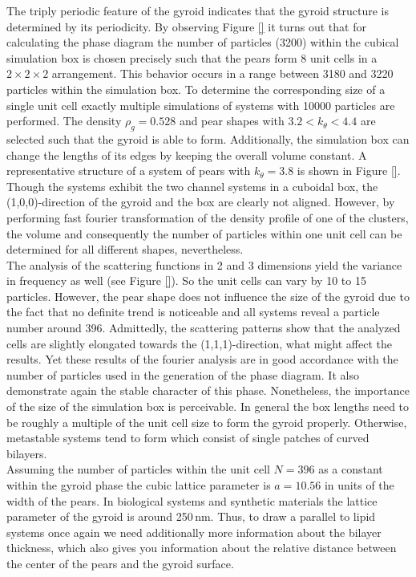 \documentclass[epj,onecolumn]{webofc}
\begin{document}
The triply periodic feature of the gyroid indicates that the gyroid structure is determined by its periodicity. By observing Figure \ref{} it turns out that for calculating the phase diagram the number of particles (3200) within the 
cubical simulation box is chosen precisely such that the pears form 8 unit cells in a $2\times 2\times 2$ arrangement. This behavior occurs in a range between 3180 and 3220 particles within the simulation box. To determine the 
corresponding size of a single unit cell exactly multiple simulations of systems with 10000 particles are performed. The density $\rho_g=0.528$ and pear shapes with $3.2<k_{\theta}<4.4$ are selected such that the gyroid is able 
to form. Additionally, the simulation box can change the lengths of its edges by keeping the overall volume constant. A representative structure of a system of pears with $k_{\theta}=3.8$ is shown in Figure \ref{}. Though the 
systems exhibit the two channel systems in a cuboidal box, the (1,0,0)-direction of the gyroid and the box are clearly not aligned. However, by performing fast fourier transformation of the density profile of one of the clusters, the 
volume and consequently the number of particles within one unit cell can be determined for all different shapes, nevertheless.\\

The analysis of the scattering functions in 2 and 3 dimensions yield the variance in frequency as well (see Figure \ref{}). So the unit cells can vary by 10 to 15 particles. However, the pear shape does not influence the size of the 
gyroid due to the fact that no definite trend is noticeable and all systems reveal a particle number around 396. Admittedly, the scattering patterns show that the analyzed cells are slightly elongated towards the (1,1,1)-direction, 
what might affect the results. Yet these results of the fourier analysis are in good accordance with the number of particles used in the generation of the phase diagram. It also demonstrate again the stable character of this phase.
Nonetheless, the importance of the size of the simulation box is perceivable. In general the box lengths need to be roughly a multiple of the unit cell size to form the gyroid properly. Otherwise, metastable systems tend to form 
which consist of single patches of curved bilayers.\\
     
Assuming the number of particles within the unit cell $N=396$ as a constant within the gyroid phase the cubic lattice parameter is $a=10.56$ in units of the width of the pears. In biological systems and synthetic materials the lattice parameter of the gyroid is around 250\,nm. Thus, to draw a parallel to lipid systems once again we need additionally more information about the bilayer thickness, which also gives you information about the relative distance between the center of the pears and the gyroid surface. 
\end{document}
